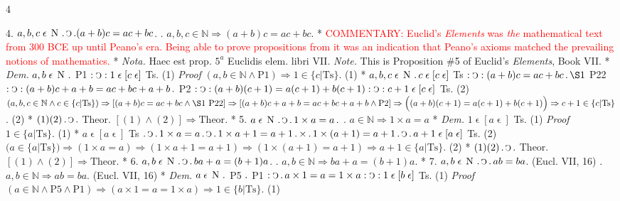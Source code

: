 \documentclass{book}
\newcommand{\s}{\switchcolumn} %
\newcommand{\C}{\mathop{\sbox0{$\displaystyle$$\reflectbox{C}$} %
\raisebox{-\height+\ht0-0.05cm}[\ht0][\dp0]{\scalebox{0.8}[0.8]{\copy0}}}\displaylimits} %
\newcommand{\p}{\mathop{\sbox0{$\displaystyle$$.$}
\raisebox{-\height+\ht0}[\ht0][\dp0]{\scalebox{1}[1]{\copy0}}}\displaylimits} %
\newcommand{\smallIn}{\ensuremath{\mathrel{\epsilon}}}
\newcommand{\N}{\mathop{\thinspace \text{N} \thinspace}}
\renewcommand{\rightarrow}{\Rightarrow}
\newcommand\commentary[1]{\textcolor{red}{COMMENTARY: #1}}
\newenvironment{translateFourCol}[4]
               { %
                 \setcolumnwidth{#1\fill/1em, #2\fill/\columnsep, #3\fill/1em, #4\fill}
                 \begin{paracol}{4}
                 \newcommand{\LAT}{\switchcolumn[0]*}
                 \newcommand{\ENG}{\switchcolumn[2]}
               }
               { %
                 \let\ENG\undefined
                 \let\LAT\undefined
                 \end{paracol}
               }
\begin{document}
\begin{translateFourCol}{0.08}{0.42}{0.08}{0.42}
\raggedright
4. \s $a,b,c \smallIn \N \p \C \p (a + b) c = a c + b c$.
\ENG
4. \s $a,b,c \in \mathbb{N} \rightarrow (a + b) c = a c + b c$.
\LAT
\s
\ENG
\s \commentary{Euclid's \emph{Elements} was \emph{the} mathematical text from 300 BCE up until Peano's era.  Being able to prove propositions from it was an indication that Peano's axioms matched the prevailing notions of mathematics.}
\LAT
\emph{Nota.} \s Haec est prop. $5^a$ Euclidis elem. libri VII.
\ENG
\emph{Note.} \s This is Proposition \#5 of Euclid's \emph{Elements}, Book VII.
\LAT
\emph{Dem.} \s $a,b \smallIn \N \p$ P1 $: \C : 1 \smallIn [c \smallIn]$ Ts. \hfill (1)
\ENG
\emph{Proof} \s $(a,b \in \mathbb{N} \wedge \text{P1}) \rightarrow 1 \in \{ c | \text{Ts} \}$. \hfill (1)
\LAT
\s $a,b,c \smallIn \N \p c \smallIn [c \smallIn]$ Ts $: \C : (a + b) c = a c + b c \p \S1$ P22 $: \C : (a + b) c + a + b = ac + bc + a + b \p$ P2 $: \C : (a + b) (c + 1) = a (c + 1) + b (c + 1) : \C : c + 1 \smallIn [c \smallIn]$ Ts. \hfill (2)
\ENG
\s $(a,b,c \in \mathbb{N} \wedge c \in \{ c | \text{Ts} \}) \rightarrow [(a + b) c = a c + b c \wedge \S1\ \text{P22}] \rightarrow [(a + b) c + a + b = ac + bc + a + b \wedge \text{P2}] \rightarrow \Big( (a + b) (c + 1) = a (c + 1) + b (c + 1) \Big) \rightarrow c + 1 \in \{ c | \text{Ts} \}$. \hfill (2)
\LAT
\s $(1)(2) \p \C \p$ Theor.
\ENG
\s $[(1) \wedge (2)] \rightarrow \text{Theor}$.
\LAT
5. \s $a \smallIn \N \p \C \p 1 \times a = a \p$
\ENG
5. \s $a \in \mathbb{N} \rightarrow 1 \times a = a$
\LAT
\emph{Dem.} \s $1 \smallIn [a \smallIn]$ Ts. \hfill (1)
\ENG
\emph{Proof} \s $1 \in \{ a | \text{Ts} \}$. \hfill (1)
\LAT
\s $a \smallIn [a \smallIn]$ Ts $\p \C \p 1 \times a = a \p \C \p 1 \times a + 1 = a + 1 \p \times \p 1 \times (a + 1) = a + 1 \p \C \p a + 1 \smallIn [a \smallIn]$ Ts. \hfill (2)
\ENG
\s $(a \in \{ a | \text{Ts} \}) \rightarrow (1 \times a = a) \rightarrow (1 \times a + 1 = a + 1) \rightarrow (1 \times (a + 1) = a + 1) \rightarrow a + 1 \in \{ a | \text{Ts} \}$. \hfill (2)
\LAT
\s $(1)(2) \p \C \p$ Theor.
\ENG
\s $[(1) \wedge (2)] \rightarrow \text{Theor}$.
\LAT
6. \s $a,b \smallIn \N \p \C \p b a + a = (b + 1) a$.
\ENG
6. \s $a,b \in \mathbb{N} \rightarrow b a + a = (b + 1) a$.
\LAT
7. \s $a,b \smallIn \N \p \C \p ab = ba$. \hfill (Eucl. VII, 16)
\ENG
7. \s $a,b \in \mathbb{N} \rightarrow ab = ba$. \hfill (Eucl. VII, 16)
\LAT
\emph{Dem.} \s $a \smallIn \N \p$ P5 $\p$ P1 $: \C \p a \times 1 = a = 1 \times a : \C : 1 \smallIn [b \smallIn]$ Ts. \hfill (1)
\ENG
\emph{Proof} \s $(a \in \mathbb{N} \wedge \text{P5} \wedge \text{P1}) \rightarrow (a \times 1 = a = 1 \times a) \rightarrow 1 \in \{ b | \text{Ts} \}$. \hfill (1)

\end{translateFourCol}
\end{document}
